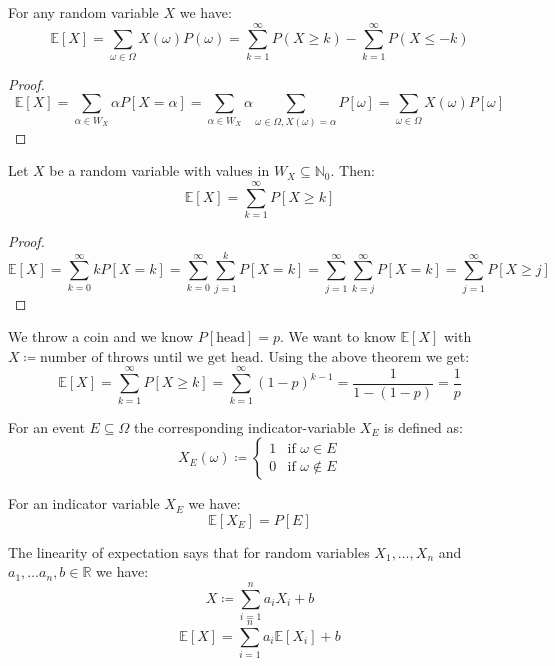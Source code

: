 \begin{lemma}
    For any random variable $X$ we have:
    $$ \mathbb{E}[X] = \sum_{\omega \in \Omega} X(\omega) P(\omega) = \sum_{k=1}^\infty P(X \geq k) - \sum_{k=1}^\infty P(X \leq -k) $$
\end{lemma}

\begin{proof}
    $$\mathbb{E}[X] = \sum_{\alpha \in W_X}\alpha P[X=\alpha] = \sum_{\alpha \in W_X}\alpha\sum_{\omega \in \Omega, X(\omega)=\alpha} P[\omega] = \sum_{\omega \in \Omega} X(\omega) P[\omega]$$
\end{proof}

\begin{theorem}
    Let $X$ be a random variable with values in $W_X \subseteq \mathbb{N}_0$. Then:
    $$\mathbb{E}[X] = \sum_{k=1}^\infty P[X \geq k]$$
\end{theorem}

\begin{proof}
    $$\mathbb{E}[X] = \sum_{k=0}^\infty k P[X=k] = \sum_{k=0}^\infty \sum_{j=1}^k P[X=k] = \sum_{j=1}^\infty \sum_{k=j}^\infty P[X=k] = \sum_{j=1}^\infty P[X \geq j]$$
\end{proof}

\begin{example}
    We throw a coin and we know $P[\text{head}] = p$. We want to know $\mathbb{E}[X]$ with $X \coloneqq \text{number of throws until we get head}$. Using the above theorem we get:
    $$\mathbb{E}[X] = \sum_{k=1}^\infty P[X \geq k] = \sum_{k=1}^\infty (1-p)^{k-1} = \frac{1}{1-(1-p)} = \frac{1}{p}$$
\end{example}

\begin{definition}
    For an event $E \subseteq \Omega$ the corresponding indicator-variable $X_E$ is defined as:
    $$ X_E(\omega) \coloneqq \begin{cases} 1 & \text{if } \omega \in E \\ 0 & \text{if } \omega \notin E \end{cases}$$
\end{definition}

\begin{remark}
    For an indicator variable $X_E$ we have:
    $$\mathbb{E}[X_E] = P[E]$$
\end{remark}

\begin{theorem}
    The linearity of expectation says that for random variables $X_1, \dots, X_n$  and $a_1, \dots a_n, b \in \mathbb{R}$ we have:
    $$X \coloneqq \sum_{i=1}^n a_i X_i + b$$
    $$\mathbb{E}[X] = \sum_{i=1}^n a_i \mathbb{E}[X_i] + b$$
\end{theorem}

